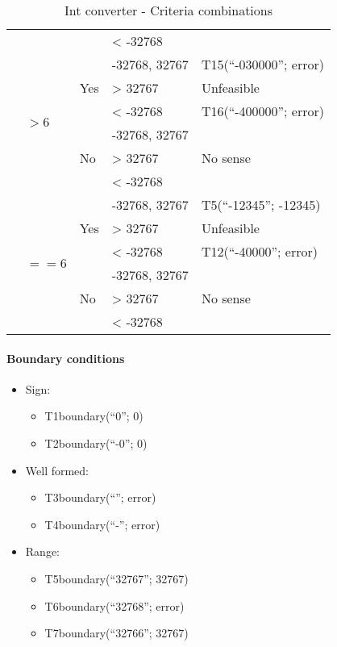 \begin{table}
\begin{tabular}{|l|l|l|l|l|}
& & & < -32768 & \\
\cline{2-5}
& \multirow{6}{*}{$> 6$} & \multirow{3}{*}{Yes} & -32768, 32767 & T15(``-030000''; error) \\
\cline{4-5}
& & & > 32767 & Unfeasible \\
\cline{4-5}
& & & < -32768 & T16(``-400000''; error)  \\
\cline{3-5}
& & \multirow{3}{*}{No} & -32768, 32767 & \multirow{3}{*}{No sense} \\
\cline{4-4}
& & & > 32767 & \\
\cline{4-4}
& & & < -32768 & \\
\cline{2-5}
& \multirow{6}{*}{$== 6$} & \multirow{3}{*}{Yes} & -32768, 32767 & T5(``-12345''; -12345) \\
\cline{4-5}
& & & > 32767 & Unfeasible \\
\cline{4-5}
& & & < -32768 & T12(``-40000''; error) \\
\cline{3-5}
& & \multirow{3}{*}{No} & -32768, 32767 & \multirow{3}{*}{No sense} \\
\cline{4-4}
& & & > 32767 & \\
\cline{4-4}
& & & < -32768 & \\
\hline
\end{tabular}
\caption{Int converter - Criteria combinations}
\label{tab:int_converter_second}
\end{table}

\paragraph{Boundary conditions}
\begin{itemize}
\item Sign:
\begin{itemize}
\item T1boundary(``0''; 0)
\item T2boundary(``-0''; 0)
\end{itemize}
\item Well formed:
\begin{itemize}
\item T3boundary(``''; error)
\item T4boundary(``-''; error)
\end{itemize}
\item Range:
\begin{itemize}
\item T5boundary(``32767''; 32767)
\item T6boundary(``32768''; error)
\item T7boundary(``32766''; 32767)
\end{itemize}
\end{itemize}

